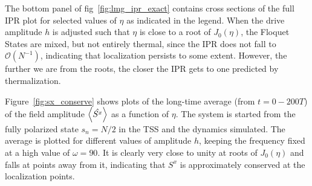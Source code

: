 \documentclass[%
reprint,
superscriptaddress,
amsmath,amssymb,
aps,
prb,
showkeys,
]{revtex4-2}
\providecommand{\DIFaddtex}[1]{{\protect\color{blue}\uwave{#1}}} %
\providecommand{\DIFaddbegin}{} %
\providecommand{\DIFaddend}{} %
\providecommand{\DIFadd}[1]{\texorpdfstring{\DIFaddtex{#1}}{#1}} %
\newcommand{\DIFaddincludegraphics}[2][]{{\color{blue}\fbox{\DIFOincludegraphics[#1]{#2}}}} %
\DeclareRobustCommand{\DIFaddbegin}{\DIFOaddbegin \let\includegraphics\DIFaddincludegraphics} %
\DeclareRobustCommand{\DIFaddend}{\DIFOaddend \let\includegraphics\DIFOincludegraphics} %
\begin{document}
The bottom panel of fig\DIFaddbegin \DIFadd{.}\DIFaddend ~\ref{fig:lmg_ipr_exact} contains cross sections of the full IPR plot for selected values of $\eta$ as indicated in the legend. When the drive amplitude $h$ is adjusted such that $\eta$ is close to a root of $J_0(\eta)$, the Floquet States are mixed, but not entirely thermal, since the IPR does not fall to $\mathcal{O}(N^{-1})$, indicating that localization persists to some extent. However, the further we are from the roots, the closer the IPR gets to one predicted by thermalization.

Figure~\ref{fig:sx_conserve} shows plots of the long-time average (from $t=0-200T$) of the field amplitude $\expval{\hat{S^x}}$ as a function of $\eta$. The system is started from the fully polarized state $s_n=N/2$ in the TSS and the dynamics simulated. The average is plotted for different values of amplitude $h$, keeping the frequency fixed at a high value of $\omega=90$. It is clearly very close to unity at roots of $J_0(\eta)$ and falls at points away from it, indicating that $S^x$ is approximately conserved at the localization points.
\end{document}
